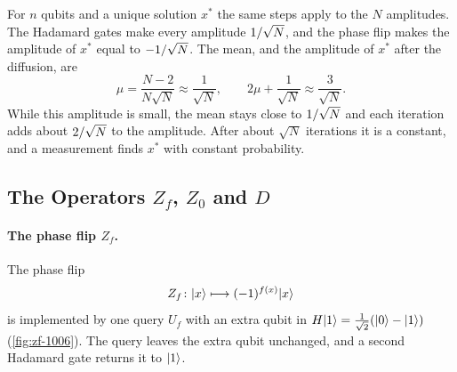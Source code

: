 For $n$ qubits and a unique solution $x^*$ the same steps apply to the $N$ amplitudes. The Hadamard
gates make every amplitude $1/\sqrt{N}$, and the phase flip makes the amplitude of $x^*$
equal to $-1/\sqrt{N}$. The mean, and the amplitude of $x^*$ after the diffusion, are
\[\mu = \frac{N-2}{N\sqrt{N}} \approx \frac{1}{\sqrt{N}}, \qquad
    2\mu + \frac{1}{\sqrt{N}} \approx \frac{3}{\sqrt{N}}.\]
While this amplitude is small, the mean stays close to $1/\sqrt{N}$ and each iteration adds
about $2/\sqrt{N}$ to the amplitude. After about $\sqrt{N}$ iterations it is a constant, and
a measurement finds $x^*$ with constant probability.

\subsection{The Operators \texorpdfstring{$Z_f$}{Zf}, \texorpdfstring{$Z_0$}{Z0} and \texorpdfstring{$D$}{D}}

\paragraph{The phase flip $Z_f$.} The phase flip
\[Z_f \colon \lvert x \rangle \longmapsto (-1)^{f(x)} \lvert x \rangle\]
is implemented by one query $U_f$ with an extra qubit in $H\lvert 1 \rangle = \frac{1}{\sqrt{2}}(\lvert 0 \rangle - \lvert 1 \rangle)$
(\cref{fig:zf-1006}). The query leaves the extra qubit unchanged, and a second Hadamard gate returns
it to $\lvert 1 \rangle$.

